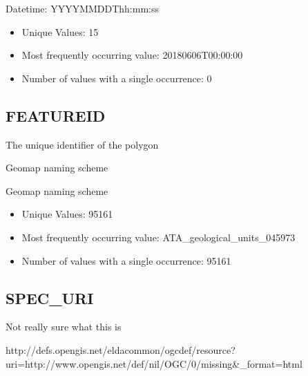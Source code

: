 \documentclass[letterpaper,10pt,english]{sphinxmanual}
\begin{document}
Datetime: YYYY\sphinxhyphen{}MM\sphinxhyphen{}DDThh:mm:ss


\begin{itemize}
\item {} 
Unique Values: 15

\item {} 
Most frequently occurring value: 2018\sphinxhyphen{}06\sphinxhyphen{}06T00:00:00

\item {} 
Number of values with a single occurrence: 0

\end{itemize}


\subsection{FEATUREID}
\label{\detokenize{field_glossary:featureid}}
The unique identifier of the polygon

Geomap naming scheme

Geomap naming scheme


\begin{itemize}
\item {} 
Unique Values: 95161

\item {} 
Most frequently occurring value: ATA\_geological\_units\_045973

\item {} 
Number of values with a single occurrence: 95161

\end{itemize}


\subsection{SPEC\_URI}
\label{\detokenize{field_glossary:spec-uri}}
Not really sure what this is

http://defs.opengis.net/elda\sphinxhyphen{}common/ogc\sphinxhyphen{}def/resource?uri=http://www.opengis.net/def/nil/OGC/0/missing\&\_format=html
\end{document}
